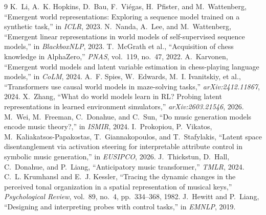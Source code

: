 \documentclass[conference]{IEEEtran}
\begin{document}
\begin{thebibliography}{9}\footnotesize
{} K.~Li, A.~K. Hopkins, D.~Bau, F.~Vi\'egas, H.~Pfister, and
M.~Wattenberg, ``Emergent world representations: Exploring a sequence model trained
on a synthetic task,'' in \emph{ICLR}, 2023.
 N.~Nanda, A.~Lee, and M.~Wattenberg, ``Emergent linear
representations in world models of self-supervised sequence models,'' in
\emph{BlackboxNLP}, 2023.
 T.~McGrath et al., ``Acquisition of chess knowledge in
AlphaZero,'' \emph{PNAS}, vol.~119, no.~47, 2022.
 A.~Karvonen, ``Emergent world models and latent variable
estimation in chess-playing language models,'' in \emph{CoLM}, 2024.
 A.~F. Spies, W.~Edwards, M.~I. Ivanitskiy, et al., ``Transformers use
causal world models in maze-solving tasks,'' \emph{arXiv:2412.11867}, 2024.
 X.~Zhang, ``What do world models learn in RL? Probing latent
representations in learned environment simulators,'' \emph{arXiv:2603.21546}, 2026.
 M.~Wei, M.~Freeman, C.~Donahue, and C.~Sun, ``Do music generation
models encode music theory?,'' in \emph{ISMIR}, 2024.
 I.~Prokopiou, P.~Vikatos, M.~Kaliakatsos-Papakostas, T.~Giannakopoulos,
and T.~Stafylakis, ``Latent space disentanglement via activation steering for
interpretable attribute control in symbolic music generation,'' in \emph{EUSIPCO}, 2026.
 J.~Thickstun, D.~Hall, C.~Donahue, and P.~Liang,
``Anticipatory music transformer,'' \emph{TMLR}, 2024.
 C.~L. Krumhansl and E.~J. Kessler, ``Tracing the dynamic
changes in the perceived tonal organization in a spatial representation of musical
keys,'' \emph{Psychological Review}, vol.~89, no.~4, pp.~334--368, 1982.
 J.~Hewitt and P.~Liang, ``Designing and interpreting
probes with control tasks,'' in \emph{EMNLP}, 2019.
\end{thebibliography}
\end{document}
